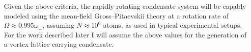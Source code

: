 Given the above criteria, the rapidly rotating condensate system will be capably modeled using the mean-field Gross--Pitaevskii theory at a rotation rate of $\Omega \approx 0.995\omega_{\perp}$, assuming $N\approx 10^6$ atoms, as used in typical experimental setups. For the work described later I will assume the above values for the generation of a vortex lattice carrying condensate.

